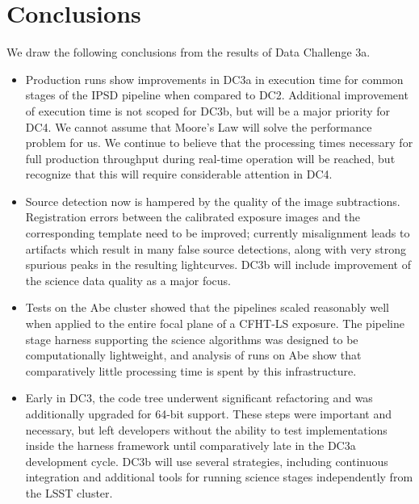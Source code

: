 
\section{Conclusions}

We draw the following conclusions from the results of Data Challenge 3a.

\begin{itemize}

\item Production runs show improvements in DC3a in execution time for common
stages of the IPSD pipeline when compared to DC2. Additional improvement of
execution time is not scoped for DC3b, but will be a major priority for DC4. We
cannot assume that Moore's Law will solve the performance problem for us. We
continue to believe that the processing times necessary for full production
throughput during real-time operation will be reached, but recognize that this
will require considerable attention in DC4.

\item Source detection now is hampered by the quality of the image subtractions.
Registration errors between the calibrated exposure images and the corresponding
template need to be improved; currently misalignment leads to artifacts which
result in many false source detections, along with very strong spurious peaks in
the resulting lightcurves. DC3b will include improvement of the science data
quality as a major focus.

\item Tests on the Abe cluster showed that the pipelines scaled reasonably 
well when applied to the entire focal plane of a CFHT-LS exposure. The 
pipeline stage harness supporting the science algorithms was designed to
be computationally lightweight, and analysis of runs on Abe show that 
comparatively little processing time is spent by this infrastructure.

\item Early in DC3, the code tree underwent significant refactoring and was
additionally upgraded for 64-bit support. These steps were important and
necessary, but left developers without the ability to test implementations
inside the harness framework until comparatively late in the DC3a development
cycle. DC3b will use several strategies, including continuous integration
and additional tools for running science stages independently from the 
LSST cluster.

\end{itemize}